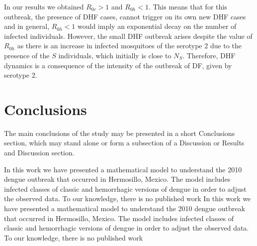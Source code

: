 \documentclass[draft, openbib]{imammb}
\numberwithin{equation}{section}
\begin{document}
        In our results we obtained $R_{0c}>1$ and  $R_{0h}<1$. This means
    that for this outbreak, the presence of DHF cases, cannot trigger
    on its own new DHF cases and in general, $R_{0h}<1$ would imply an
    exponential decay on the number of infected individuals. However,
    the small DHF outbreak arises despite the value of $R_{0h}$ as
    there is an increase in infected mosquitoes of the serotype 2 due
    to the presence of the $S$ individuals, which initially is close
    to $N_S$. Therefore, DHF dynamics is a consequence of the
    intensity of the outbreak of DF, given by serotype 2.
     

    \section{Conclusions}
        


        The main conclusions of the study may be presented in a 
    short Conclusions section, which may stand alone or form 
    a subsection of a Discussion or Results and Discussion 
    section.
    
	    In this work we have presented a mathematical model to understand the 2010 
    dengue outbreak that occurred in Hermosillo, Mexico. The model includes 
    infected classes of classic and hemorrhagic versions of dengue in order to 
    adjust the observed data. To our knowledge, there is no published work
        In this work we have presented a mathematical model to understand
    the 2010 dengue outbreak that occurred in Hermosillo, Mexico. The
    model includes infected classes of classic and hemorrhagic
    versions of dengue in order to adjust the observed data. To our
    knowledge, there is no published work
    
\end{document}

